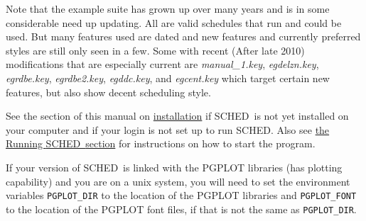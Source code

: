 \documentclass{report}
\newcommand{\sched}{{\sc SCHED}}
\newcommand{\schedb}{{\sc SCHED~}}
\begin{document}
Note that the example suite has grown up over many years and is in
some considerable need up updating.  All are valid schedules that run
and could be used.  But many features used are dated and new features
and currently preferred styles are still only seen in a few.  Some
with recent (After late 2010) modifications that are especially current are
{\sl manual\_1.key}, {\sl egdelzn.key}, {\sl egrdbe.key}, 
{\sl egrdbe2.key}, {\sl egddc.key}, and {\sl egcent.key} which target 
certain new features, but also show decent scheduling style.

See the section of this manual on
\hyperref[SEC:INSTALL]{installation}
if \schedb is not yet installed on your computer and if your login
is not set up to run \sched.  Also see
\hyperref[SEC:RUNSCHED]{the Running \schedb section}
for instructions on how to start the program.

If your version of \schedb is linked with the {\sc PGPLOT} libraries
(has plotting capability) and you are on a unix system, you will need
to set the environment variables {\tt PGPLOT\_DIR} to the location of
the {\sc PGPLOT} libraries and {\tt PGPLOT\_FONT} to the location of
the {\sc PGPLOT} font files, if that is not the same as {\tt PGPLOT\_DIR}.
\end{document}
